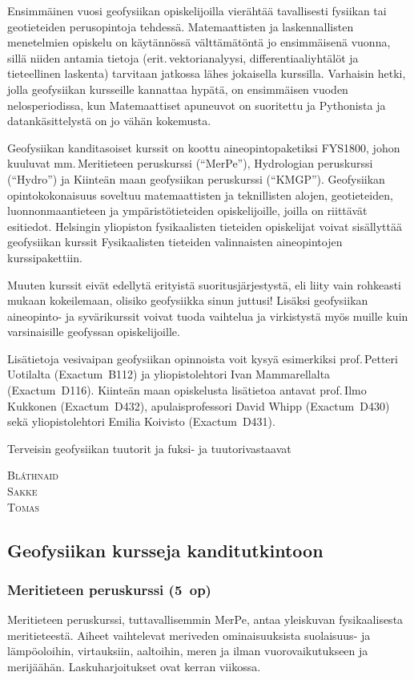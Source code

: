 \documentclass[../ala_hataile.tex]{subfiles}
\begin{document}
Ensimmäinen vuosi geofysiikan opiskelijoilla vierähtää tavallisesti fysiikan tai geotieteiden perusopintoja tehdessä. Matemaattisten ja laskennallisten menetelmien opiskelu on käytännössä välttämätöntä jo ensimmäisenä vuonna, sillä
niiden antamia tietoja (erit.\,vektorianalyysi, differentiaaliyhtälöt ja tieteellinen laskenta) tarvitaan jatkossa lähes jokaisella kurssilla. Varhaisin hetki, jolla geofysiikan kursseille kannattaa hypätä, on ensimmäisen vuoden nelosperiodissa, kun Matemaattiset apuneuvot on suoritettu ja Pythonista ja datankäsittelystä on jo vähän kokemusta.

Geofysiikan kanditasoiset kurssit on koottu aineopintopaketiksi FYS1800, johon kuuluvat mm.\,Meritieteen peruskurssi (``MerPe''), Hydrologian peruskurssi (``Hydro'') ja Kiinteän maan geofysiikan peruskurssi (``KMGP''). Geofysiikan opintokokonaisuus soveltuu matemaattisten ja teknillisten alojen, geotieteiden, luonnonmaantieteen ja ympäristötieteiden opiskelijoille, joilla on riittävät esitiedot. Helsingin yliopiston fysikaalisten tieteiden opiskelijat voivat sisällyttää geofysiikan kurssit Fysikaalisten tieteiden valinnaisten aineopintojen kurssipakettiin.

Muuten kurssit eivät edellytä
erityistä suoritusjärjestystä, eli liity vain
rohkeasti mukaan kokeilemaan, olisiko
geofysiikka sinun juttusi! Lisäksi geofysiikan
aineopinto- ja syvärikurssit voivat tuoda vaihtelua ja virkistystä
myös muille kuin varsinaisille geofyssan opiskelijoille.

Lisätietoja vesivaipan geofysiikan opinnoista
voit kysyä esimerkiksi prof.\,Petteri Uotilalta (Exactum~B112) ja yli\-opisto\-lehtori Ivan Mammarellalta (Exactum~D116). Kiinteän maan opiskelusta lisätietoa
antavat prof.\,Ilmo Kukkonen (Exactum~D432), apulaisprofessori David Whipp (Exactum~D430) sekä yli\-opisto\-lehtori Emilia Koivisto (Exactum~D431).

Terveisin geofysiikan tuutorit ja fuksi- ja
tuutorivastaavat

\vspace{0.5cm}
\noindent\textsc{Bláthnaid}\\
\textsc{Sakke}\\
\textsc{Tomas}
\vspace{1cm}

\subsection*{Geofysiikan kursseja kanditutkintoon}
\subsubsection*{Meritieteen peruskurssi (5~op)}
Meritieteen peruskurssi, tuttavallisemmin
MerPe, antaa yleiskuvan fysikaalisesta
meritieteestä. Aiheet vaihtelevat meriveden
ominaisuuksista suolaisuus- ja lämpöoloihin,
virtauksiin, aaltoihin, meren ja ilman
vuorovaikutukseen ja merijäähän. Laskuharjoitukset
ovat kerran viikossa.
\end{document}
